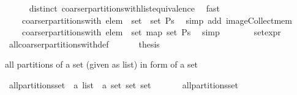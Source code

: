 \begin{isabellebody}
\ \ \ \ \isamarkupfalse%
\ distinct\ coarser{\isacharunderscore}partitions{\isacharunderscore}with{\isacharunderscore}list{\isacharunderscore}equivalence\ \isamarkupfalse%
\ fast\isanewline
\ \ \isamarkupfalse%
\ \isamarkupfalse%
\ {\isachardoublequoteopen}{\isasymdots}\ {\isacharequal}\ {\isasymUnion}\ {\isacharparenleft}coarser{\isacharunderscore}partitions{\isacharunderscore}with\ elem\ {\isacharbackquote}\ {\isacharparenleft}set\ {\isacharbackquote}\ {\isacharparenleft}set\ Ps{\isacharparenright}{\isacharparenright}{\isacharparenright}{\isachardoublequoteclose}\ \isamarkupfalse%
\ {\isacharparenleft}simp\ add{\isacharcolon}\ image{\isacharunderscore}Collect{\isacharunderscore}mem{\isacharparenright}\isanewline
\ \ \isamarkupfalse%
\ \isamarkupfalse%
\ {\isachardoublequoteopen}{\isasymdots}\ {\isacharequal}\ {\isasymUnion}\ {\isacharparenleft}coarser{\isacharunderscore}partitions{\isacharunderscore}with\ elem\ {\isacharbackquote}\ {\isacharparenleft}set\ {\isacharparenleft}map\ set\ Ps{\isacharparenright}{\isacharparenright}{\isacharparenright}{\isachardoublequoteclose}\ \isamarkupfalse%
\ simp\isanewline
\ \ \isamarkupfalse%
\ \isamarkupfalse%
\ {\isachardoublequoteopen}{\isasymdots}\ {\isacharequal}\ {\isacharquery}set{\isacharunderscore}expr{\isachardoublequoteclose}\ \isamarkupfalse%
\ all{\isacharunderscore}coarser{\isacharunderscore}partitions{\isacharunderscore}with{\isacharunderscore}def\ \isacommand{{\isachardot}{\isachardot}}\isamarkupfalse%
\isanewline
\ \ \isamarkupfalse%
\ \isamarkupfalse%
\ {\isacharquery}thesis\ \isacommand{{\isachardot}}\isamarkupfalse%
\isanewline
{}\isamarkupfalse%
%
\endisatagproof
{\isafoldproof}%
%
\isadelimproof
%
\endisadelimproof
%
\begin{isamarkuptext}%
all partitions of a set (given as list) in form of a set%
\end{isamarkuptext}%
\isamarkuptrue%
\isamarkupfalse%
\ all{\isacharunderscore}partitions{\isacharunderscore}set\ {\isacharcolon}{\isacharcolon}\ {\isachardoublequoteopen}{\isacharprime}a\ list\ {\isasymRightarrow}\ {\isacharprime}a\ set\ set\ set{\isachardoublequoteclose}\isanewline
\ \ \ \isanewline
\ \ \ {\isachardoublequoteopen}all{\isacharunderscore}partitions{\isacharunderscore}set\ {\isacharbrackleft}{\isacharbrackright}\ {\isacharequal}\ {\isacharbraceleft}{\isacharbraceleft}{\isacharbraceright}{\isacharbraceright}{\isachardoublequoteclose}\ {\isacharbar}\isanewline

\end{isabellebody}
